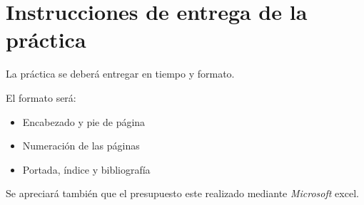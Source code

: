\documentclass[11pt]{article}
\begin{document}
\section{Instrucciones de entrega de la práctica}
\label{sec:org52ad082}
La práctica se deberá entregar en tiempo y formato.

El formato será:
\begin{itemize}
\item Encabezado y pie de página
\item Numeración de las páginas
\item Portada, índice y bibliografía
\end{itemize}

Se apreciará también que el presupuesto este realizado mediante \emph{Microsoft} excel.
\end{document}
